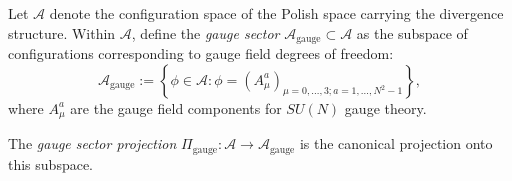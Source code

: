 \begin{definition}
\label{def:gaugeSectorProjection}

Let $\mathcal{A}$ denote the configuration space of the Polish space carrying the divergence structure. Within $\mathcal{A}$, define the \emph{gauge sector} $\mathcal{A}_{\mathrm{gauge}} \subset \mathcal{A}$ as the subspace of configurations corresponding to gauge field degrees of freedom:
\begin{equation}
\mathcal{A}_{\mathrm{gauge}} := \left\{ \phi \in \mathcal{A} : \phi = (A_\mu^a)_{\mu=0,\ldots,3; a=1,\ldots,N^2-1} \right\},
\end{equation}
where $A_\mu^a$ are the gauge field components for $SU(N)$ gauge theory.

The \emph{gauge sector projection} $\Pi_{\mathrm{gauge}} : \mathcal{A} \to \mathcal{A}_{\mathrm{gauge}}$ is the canonical projection onto this subspace.

\end{definition}

